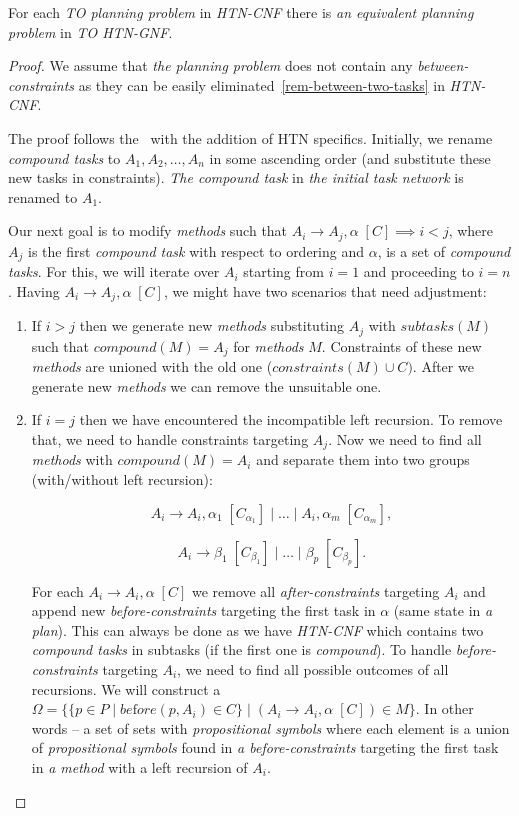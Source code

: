 \begin{thm}\label{thm04:13}
    For each \emph{TO planning problem} in \emph{HTN-CNF} there is \emph{an equivalent planning problem} in \emph{TO HTN-GNF}.
\end{thm}
\begin{proof}
    We assume that \emph{the planning problem} does not contain any \emph{between-constraints} as they can be easily eliminated~\ref{rem-between-two-tasks} in \emph{HTN-CNF}.

    The proof follows the~\cite{gnf_bartak} with the addition of HTN specifics. Initially, we rename \emph{compound tasks} to $A_1, A_2, \dots, A_n$ in some ascending order (and substitute these new tasks in constraints). \emph{The compound task} in \emph{the initial task network} is renamed to $A_1$. 
    
    Our next goal is to modify \emph{methods} such that $A_i \rightarrow A_j, \alpha \; [C] \implies i < j$, where $A_j$ is the first \emph{compound task} with respect to ordering and $\alpha$, is a set of \emph{compound tasks}. For this, we will iterate over $A_i$ starting from $i = 1$ and proceeding to $i = n$. Having $A_i \rightarrow A_j, \alpha \; [C]$, we might have two scenarios that need adjustment:

    \begin{enumerate}
        \item If $i > j$ then we generate new \emph{methods} substituting $A_j$ with $subtasks(M)$ such that $compound(M) = A_j$ for \emph{methods} $M$. Constraints of these new \emph{methods} are unioned with the old one ($constraints(M) \cup C)$. After we generate new \emph{methods} we can remove the unsuitable one.

        \item If $i = j$ then we have encountered the incompatible left recursion. To remove that, we need to handle constraints targeting $A_j$. Now we need to find all \emph{methods} with $compound(M) = A_i$ and separate them into two groups (with/without left recursion):

        \[
            A_i \rightarrow A_i, \alpha_1 \; [C_{\alpha_1}] \; | \; \dots \; | \; A_i, \alpha_m \; [C_{\alpha_m}],
        \]
    
        \[
            A_i \rightarrow \beta_1 \; [C_{\beta_1}] \; | \; \dots \; | \; \beta_p \; [C_{\beta_p}].
        \]

        For each $A_i \rightarrow A_i, \alpha \; [C]$ we remove all \emph{after-constraints} targeting $A_i$ and append new \emph{before-constraints} targeting the first task in $\alpha$ (same state in \emph{a plan}). This can always be done as we have \emph{HTN-CNF} which contains two \emph{compound tasks} in subtasks (if the first one is \emph{compound}). To handle \emph{before-constraints} targeting $A_i$, we need to find all possible outcomes of all recursions. We will construct a $\Omega = \{\{ p \in P \; | \; be\text{f}ore(p, A_i) \in C\} \; | \; (A_i \rightarrow A_i, \alpha \; [C]) \in M \}$. In other words – a set of sets with \emph{propositional symbols} where each element is a union of \emph{propositional symbols} found in \emph{a before-constraints} targeting the first task in \emph{a method} with a left recursion of $A_i$.


\end{enumerate}
\end{proof}
